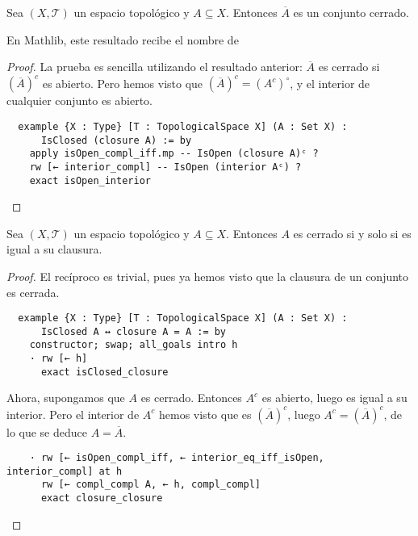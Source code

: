 \begin{proposition}
  Sea $(X, \mathcal{T})$ un espacio topológico y $A \subseteq X$. Entonces $\overline{A}$ es un conjunto cerrado.
\end{proposition}

En Mathlib, este resultado recibe el nombre de 

\begin{proof}
  La prueba es sencilla utilizando el resultado anterior: $\overline{A}$ es cerrado si $(\overline{A})^c$ es abierto. Pero hemos visto que $(\overline{A})^c = (A^c)^\circ$, y el interior de cualquier conjunto es abierto.

  \begin{lstlisting}
  example {X : Type} [T : TopologicalSpace X] (A : Set X) :
      IsClosed (closure A) := by
    apply isOpen_compl_iff.mp -- IsOpen (closure A)ᶜ ?
    rw [← interior_compl] -- IsOpen (interior Aᶜ) ?
    exact isOpen_interior \end{lstlisting}
\end{proof}

\begin{proposition}
  Sea $(X, \mathcal{T})$ un espacio topológico y $A \subseteq X$. Entonces $A$ es cerrado si y solo si es igual a su clausura.
\end{proposition}

\begin{proof}
  El recíproco es trivial, pues ya hemos visto que la clausura de un conjunto es cerrada.

  \begin{lstlisting}
  example {X : Type} [T : TopologicalSpace X] (A : Set X) :
      IsClosed A ↔ closure A = A := by
    constructor; swap; all_goals intro h
    · rw [← h]
      exact isClosed_closure \end{lstlisting}

  Ahora, supongamos que $A$ es cerrado. Entonces $A^c$ es abierto, luego es igual a su interior. Pero el interior de $A^c$ hemos visto que es $(\overline{A})^c$, luego $A^c = (\overline{A})^c$, de lo que se deduce $A = \overline{A}$.

  \begin{lstlisting}
    · rw [← isOpen_compl_iff, ← interior_eq_iff_isOpen, interior_compl] at h
      rw [← compl_compl A, ← h, compl_compl]
      exact closure_closure \end{lstlisting}
  
\end{proof}


